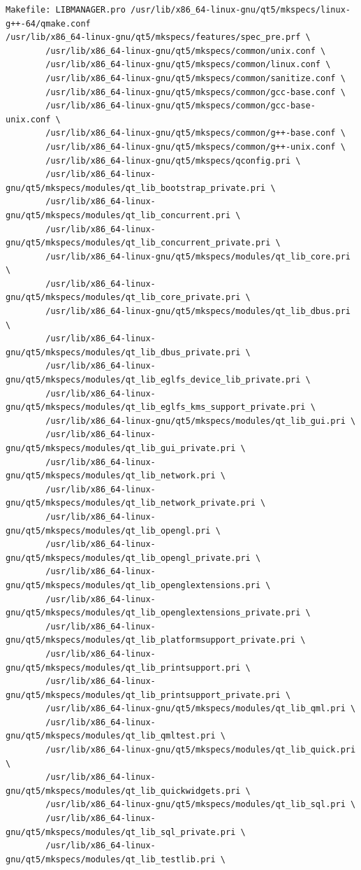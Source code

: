 \documentclass[a4paper]{article}
\begin{document}
\begin{verbatim}
Makefile: LIBMANAGER.pro /usr/lib/x86_64-linux-gnu/qt5/mkspecs/linux-g++-64/qmake.conf 
/usr/lib/x86_64-linux-gnu/qt5/mkspecs/features/spec_pre.prf \
		/usr/lib/x86_64-linux-gnu/qt5/mkspecs/common/unix.conf \
		/usr/lib/x86_64-linux-gnu/qt5/mkspecs/common/linux.conf \
		/usr/lib/x86_64-linux-gnu/qt5/mkspecs/common/sanitize.conf \
		/usr/lib/x86_64-linux-gnu/qt5/mkspecs/common/gcc-base.conf \
		/usr/lib/x86_64-linux-gnu/qt5/mkspecs/common/gcc-base-unix.conf \
		/usr/lib/x86_64-linux-gnu/qt5/mkspecs/common/g++-base.conf \
		/usr/lib/x86_64-linux-gnu/qt5/mkspecs/common/g++-unix.conf \
		/usr/lib/x86_64-linux-gnu/qt5/mkspecs/qconfig.pri \
		/usr/lib/x86_64-linux-gnu/qt5/mkspecs/modules/qt_lib_bootstrap_private.pri \
		/usr/lib/x86_64-linux-gnu/qt5/mkspecs/modules/qt_lib_concurrent.pri \
		/usr/lib/x86_64-linux-gnu/qt5/mkspecs/modules/qt_lib_concurrent_private.pri \
		/usr/lib/x86_64-linux-gnu/qt5/mkspecs/modules/qt_lib_core.pri \
		/usr/lib/x86_64-linux-gnu/qt5/mkspecs/modules/qt_lib_core_private.pri \
		/usr/lib/x86_64-linux-gnu/qt5/mkspecs/modules/qt_lib_dbus.pri \
		/usr/lib/x86_64-linux-gnu/qt5/mkspecs/modules/qt_lib_dbus_private.pri \
		/usr/lib/x86_64-linux-gnu/qt5/mkspecs/modules/qt_lib_eglfs_device_lib_private.pri \
		/usr/lib/x86_64-linux-gnu/qt5/mkspecs/modules/qt_lib_eglfs_kms_support_private.pri \
		/usr/lib/x86_64-linux-gnu/qt5/mkspecs/modules/qt_lib_gui.pri \
		/usr/lib/x86_64-linux-gnu/qt5/mkspecs/modules/qt_lib_gui_private.pri \
		/usr/lib/x86_64-linux-gnu/qt5/mkspecs/modules/qt_lib_network.pri \
		/usr/lib/x86_64-linux-gnu/qt5/mkspecs/modules/qt_lib_network_private.pri \
		/usr/lib/x86_64-linux-gnu/qt5/mkspecs/modules/qt_lib_opengl.pri \
		/usr/lib/x86_64-linux-gnu/qt5/mkspecs/modules/qt_lib_opengl_private.pri \
		/usr/lib/x86_64-linux-gnu/qt5/mkspecs/modules/qt_lib_openglextensions.pri \
		/usr/lib/x86_64-linux-gnu/qt5/mkspecs/modules/qt_lib_openglextensions_private.pri \
		/usr/lib/x86_64-linux-gnu/qt5/mkspecs/modules/qt_lib_platformsupport_private.pri \
		/usr/lib/x86_64-linux-gnu/qt5/mkspecs/modules/qt_lib_printsupport.pri \
		/usr/lib/x86_64-linux-gnu/qt5/mkspecs/modules/qt_lib_printsupport_private.pri \
		/usr/lib/x86_64-linux-gnu/qt5/mkspecs/modules/qt_lib_qml.pri \
		/usr/lib/x86_64-linux-gnu/qt5/mkspecs/modules/qt_lib_qmltest.pri \
		/usr/lib/x86_64-linux-gnu/qt5/mkspecs/modules/qt_lib_quick.pri \
		/usr/lib/x86_64-linux-gnu/qt5/mkspecs/modules/qt_lib_quickwidgets.pri \
		/usr/lib/x86_64-linux-gnu/qt5/mkspecs/modules/qt_lib_sql.pri \
		/usr/lib/x86_64-linux-gnu/qt5/mkspecs/modules/qt_lib_sql_private.pri \
		/usr/lib/x86_64-linux-gnu/qt5/mkspecs/modules/qt_lib_testlib.pri \

\end{verbatim}
\end{document}
